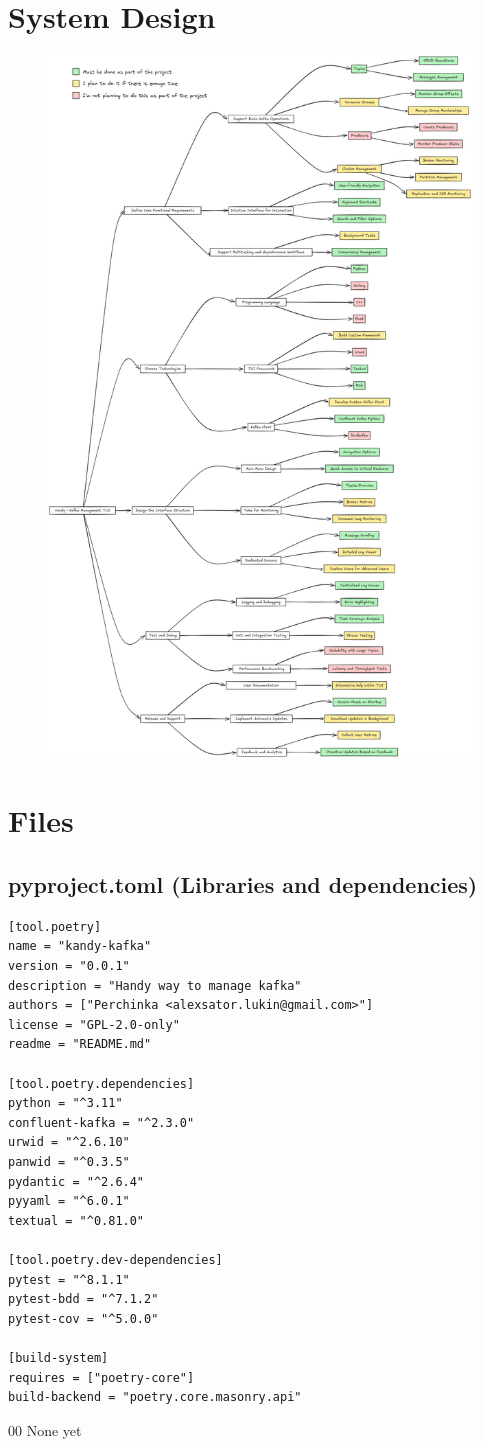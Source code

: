 \documentclass[10pt , a4paper]{report}
\begin{document}
\chapter{System Design}\label{appendix:system_design}
\begin{figure}[htpb]
    \centering
    \includegraphics[width=0.7\linewidth]{imgs/SystemDesign.png}
\end{figure}

\chapter{Files}
\section{pyproject.toml (Libraries and dependencies)}\label{appendix:libs}
\begin{listing}[htbp]
    \begin{verbatim}
[tool.poetry]
name = "kandy-kafka"
version = "0.0.1"
description = "Handy way to manage kafka"
authors = ["Perchinka <alexsator.lukin@gmail.com>"]
license = "GPL-2.0-only"
readme = "README.md"

[tool.poetry.dependencies]
python = "^3.11"
confluent-kafka = "^2.3.0"
urwid = "^2.6.10"
panwid = "^0.3.5"
pydantic = "^2.6.4"
pyyaml = "^6.0.1"
textual = "^0.81.0"

[tool.poetry.dev-dependencies]
pytest = "^8.1.1"
pytest-bdd = "^7.1.2"
pytest-cov = "^5.0.0"

[build-system]
requires = ["poetry-core"]
build-backend = "poetry.core.masonry.api"
    \end{verbatim}
    \caption{pyproject.toml}
\end{listing}

\renewcommand{\bibname}{References}
\begin{thebibliography}{00}
 None yet
\end{thebibliography}
\end{document}

